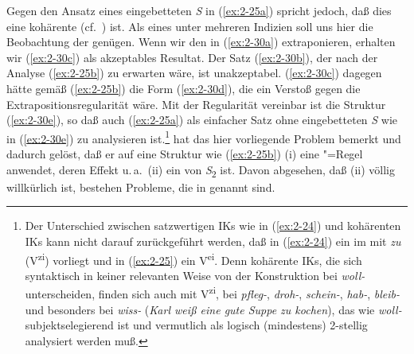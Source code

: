 \documentclass[output=paper]{langsci/langscibook}
\begin{document}
Gegen den Ansatz eines eingebetteten \textit{S} in (\ref{ex:2-25a}) spricht jedoch, daß dies eine
kohärente  (cf.\ \citealt{Bech1955}) ist. Als eines unter mehreren Indizien
soll uns hier die Beobachtung der  genügen. Wenn wir den  in
(\ref{ex:2-30a}) extraponieren, erhalten wir (\ref{ex:2-30c}) als akzeptables Resultat. Der Satz
(\ref{ex:2-30b}), der nach der Analyse (\ref{ex:2-25b}) zu erwarten wäre, ist
unakzeptabel. (\ref{ex:2-30c}) dagegen hätte gemäß (\ref{ex:2-25b}) die Form (\ref{ex:2-30d}), die
ein Verstoß gegen die Extrapositionsregularität wäre. Mit der Regularität vereinbar ist die Struktur
(\ref{ex:2-30e}), so daß auch (\ref{ex:2-25a}) als einfacher Satz ohne eingebetteten \textit{S} wie
in (\ref{ex:2-30e}) zu analysieren ist.\footnote{%
	Der Unterschied zwischen satzwertigen IKs wie in
  (\ref{ex:2-24}) und kohärenten IKs kann nicht darauf zurückgeführt werden, daß in (\ref{ex:2-24})
  ein  im  mit \textit{zu} (V\textsuperscript{zi}) vorliegt und in (\ref{ex:2-25}) ein
  V\textsuperscript{ei}. Denn kohärente IKs, die sich syntaktisch in keiner relevanten Weise von der
  Konstruktion bei \textit{woll-} unterscheiden, finden sich auch mit V\textsuperscript{zi},
  \zb bei \textit{pfleg-}, \textit{droh-}, \textit{schein-}, \textit{hab-}, \textit{bleib-} und
  besonders bei \textit{wiss-} (\textit{Karl weiß eine gute Suppe zu kochen}), das wie
  \textit{woll-} subjektselegierend ist und vermutlich als logisch (mindestens) 2-stellig analysiert
  werden muß.%
}
\eal \label{ex:2-30}
	 \label{ex:2-30a}
	 \label{ex:2-30b}
	 \label{ex:2-30c}
	 \label{ex:2-30d}
	 \label{ex:2-30e}
\zl 
\citet{Evers75} hat das hier vorliegende Problem bemerkt und dadurch gelöst, daß er auf eine Struktur wie (\ref{ex:2-25b}) (i) eine "=Regel anwendet, deren Effekt u.\,a.\ (ii) ein  von \textit{S}\textsubscript{2} ist. Davon abgesehen, daß (ii) völlig willkürlich ist, bestehen Probleme, die in \citet[86f.]{Hoehle78a} genannt sind.
\end{document}
